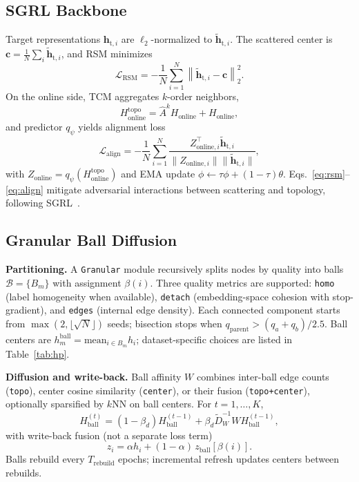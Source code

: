 \documentclass[conference]{IEEEtran}
\begin{document}
\subsection{SGRL Backbone}
Target representations $\mathbf{h}_{\mathrm{t},i}$ are $\ell_2$-normalized to $\tilde{\mathbf{h}}_{\mathrm{t},i}$.
The scattered center is $\mathbf{c}=\frac{1}{N}\sum_i \tilde{\mathbf{h}}_{\mathrm{t},i}$, and RSM minimizes
\begin{equation}
  \mathcal{L}_{\mathrm{RSM}} = -\frac{1}{N}\sum_{i=1}^{N}\left\|\tilde{\mathbf{h}}_{\mathrm{t},i}-\mathbf{c}\right\|_2^2.
  \label{eq:rsm}
\end{equation}
On the online side, TCM aggregates $k$-order neighbors,
\begin{equation}
  H_{\mathrm{online}}^{\mathrm{topo}} = \hat{A}^{k}H_{\mathrm{online}} + H_{\mathrm{online}},
  \label{eq:tcm}
\end{equation}
and predictor $q_\psi$ yields alignment loss
\begin{equation}
  \mathcal{L}_{\mathrm{align}} = -\frac{1}{N}\sum_{i=1}^{N}
  \frac{Z_{\mathrm{online},i}^{\top}\tilde{\mathbf{h}}_{\mathrm{t},i}}
  {\|Z_{\mathrm{online},i}\|\|\tilde{\mathbf{h}}_{\mathrm{t},i}\|},
  \label{eq:align}
\end{equation}
with $Z_{\mathrm{online}}=q_\psi(H_{\mathrm{online}}^{\mathrm{topo}})$ and EMA update $\phi\leftarrow\tau\phi+(1-\tau)\theta$.
Eqs.~\eqref{eq:rsm}--\eqref{eq:align} mitigate adversarial interactions between scattering and topology, following SGRL~\cite{he2024sgrl}.

\subsection{Granular Ball Diffusion}
\textbf{Partitioning.}
A \texttt{Granular} module recursively splits nodes by quality into balls $\mathcal{B}=\{B_m\}$ with assignment $\beta(i)$.
Three quality metrics are supported: \texttt{homo} (label homogeneity when available), \texttt{detach} (embedding-space cohesion with stop-gradient), and \texttt{edges} (internal edge density).
Each connected component starts from $\max(2,\lfloor\sqrt{N}\rfloor)$ seeds; bisection stops when $q_{\mathrm{parent}} > (q_a + q_b)/2.5$.
Ball centers are $h_m^{\mathrm{ball}}=\mathrm{mean}_{i\in B_m} h_i$; dataset-specific choices are listed in Table~\ref{tab:hp}.

\textbf{Diffusion and write-back.}
Ball affinity $W$ combines inter-ball edge counts (\texttt{topo}), center cosine similarity (\texttt{center}), or their fusion (\texttt{topo+center}), optionally sparsified by $k$NN on ball centers.
For $t=1,\ldots,K$,
\begin{equation}
  H^{(t)}_{\mathrm{ball}} = (1-\beta_d) H^{(t-1)}_{\mathrm{ball}} + \beta_d \tilde{D}_W^{-1} W H^{(t-1)}_{\mathrm{ball}},
  \label{eq:diffuse}
\end{equation}
with write-back fusion (not a separate loss term)
\begin{equation}
  z_i = \alpha h_i + (1-\alpha)\, z_{\mathrm{ball}}[\beta(i)].
  \label{eq:writeback}
\end{equation}
Balls rebuild every $T_{\mathrm{rebuild}}$ epochs; incremental refresh updates centers between rebuilds.
\end{document}
